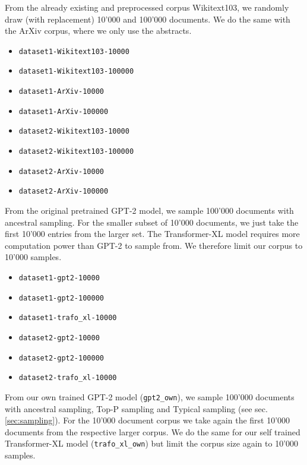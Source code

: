 From the already existing and preprocessed corpus Wikitext103, we randomly draw (with replacement) 10'000 and 100'000 documents. We do the same with the ArXiv corpus, where we only use the abstracts.
\begin{multicols}{2}
\begin{itemize}
    \item \texttt{dataset1-Wikitext103-10000}
    \item \texttt{dataset1-Wikitext103-100000}
    \item \texttt{dataset1-ArXiv-10000}
    \item \texttt{dataset1-ArXiv-100000}
    \item \texttt{dataset2-Wikitext103-10000}
    \item \texttt{dataset2-Wikitext103-100000}
    \item \texttt{dataset2-ArXiv-10000}
    \item \texttt{dataset2-ArXiv-100000}
\end{itemize}
\end{multicols}
From the original pretrained GPT-2 model, we sample 100'000 documents with ancestral sampling. For the smaller subset of 10'000 documents, we just take the first 10'000 entries from the larger set. The Transformer-XL model requires more computation power than GPT-2 to sample from. We therefore limit our corpus to 10'000 samples.
\begin{multicols}{2}
\begin{itemize}
    \item \texttt{dataset1-gpt2-10000}
    \item \texttt{dataset1-gpt2-100000}
    \item \texttt{dataset1-trafo\_xl-10000}
    \item \texttt{dataset2-gpt2-10000}
    \item \texttt{dataset2-gpt2-100000}
    \item \texttt{dataset2-trafo\_xl-10000}
\end{itemize}
\end{multicols}
From our own trained GPT-2 model (\texttt{gpt2\_own}), we sample 100'000 documents with ancestral sampling, Top-P sampling and Typical sampling (see sec. \ref{sec:sampling}). For the 10'000 document corpus we take again the first 10'000 documents from the respective larger corpus. We do the same for our self trained Transformer-XL model (\texttt{trafo\_xl\_own}) but limit the corpus size again to 10'000 samples. 
